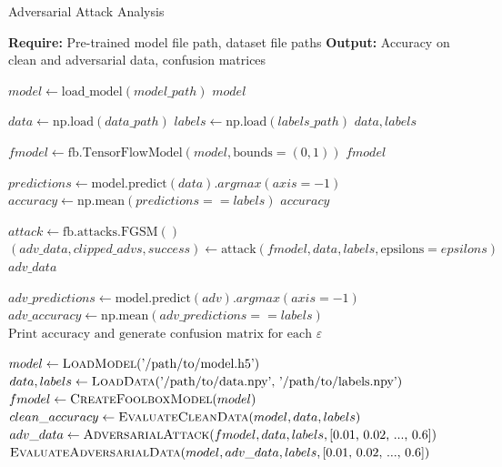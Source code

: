 \documentclass[11pt,onside]{article}
\begin{document}
\maketitle


\begin{algorithm}[H]
\caption{Adversarial Attack Analysis}
\begin{algorithmic}

\State \textbf{Require:} Pre-trained model file path, dataset file paths
\State \textbf{Output:} Accuracy on clean and adversarial data, confusion matrices

    \State $model \gets \text{load\_model}(model\_path)$
    \State \Return $model$
\EndProcedure

    \State $data \gets \text{np.load}(data\_path)$
    \State $labels \gets \text{np.load}(labels\_path)$
    \State \Return $data, labels$
\EndProcedure

    \State $fmodel \gets \text{fb.TensorFlowModel}(model, \text{bounds}=(0, 1))$
    \State \Return $fmodel$
\EndProcedure

    \State $predictions \gets \text{model.predict}(data).argmax(axis=-1)$
    \State $accuracy \gets \text{np.mean}(predictions == labels)$
    \State \Return $accuracy$
\EndProcedure

    \State $attack \gets \text{fb.attacks.FGSM}()$
    \State $(adv\_data, clipped\_advs, success) \gets \text{attack}(fmodel, data, labels, \text{epsilons}=epsilons)$
    \State \Return $adv\_data$
\EndProcedure

        \State $adv\_predictions \gets \text{model.predict}(adv).argmax(axis=-1)$
        \State $adv\_accuracy \gets \text{np.mean}(adv\_predictions == labels)$
        \State $\text{Print accuracy and generate confusion matrix for each } \varepsilon$
    \EndFor
\EndProcedure

\State $model \gets \Call{LoadModel}{\text{'/path/to/model.h5'}}$
\State $data, labels \gets \Call{LoadData}{\text{'/path/to/data.npy', '/path/to/labels.npy'}}$
\State $fmodel \gets \Call{CreateFoolboxModel}{model}$
\State $clean\_accuracy \gets \Call{EvaluateCleanData}{model, data, labels}$
\State $adv\_data \gets \Call{AdversarialAttack}{fmodel, data, labels, \text{[0.01, 0.02, ..., 0.6]}}$
\State $\Call{EvaluateAdversarialData}{model, adv\_data, labels, \text{[0.01, 0.02, ..., 0.6]}}$

\end{algorithmic}
\end{algorithm}
\end{document}
